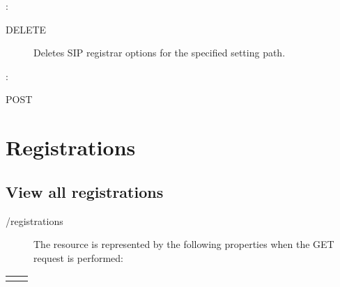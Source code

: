 \documentclass[letterpaper,10pt,english]{sphinxmanual}
\begin{document}
:

\begin{sphinxVerbatim}[commandchars=\\\{\}]
\end{sphinxVerbatim}
\begin{description}
\item[{ DELETE}] \leavevmode
Deletes SIP registrar options for the specified setting path.

\end{description}

:

\begin{sphinxVerbatim}[commandchars=\\\{\}]
\end{sphinxVerbatim}

 POST


\section{Registrations}
\label{\detokenize{restapi:registrations}}

\subsection{View all registrations}
\label{\detokenize{restapi:view-all-registrations}}
 /registrations
\begin{description}
\item[{}] \leavevmode
The resource is represented by the following properties when the GET request is performed:

\end{description}


\begin{savenotes}\sphinxattablestart
\centering
\begin{tabulary}{\linewidth}[t]{|T|T|}
\hline

&
\\
\hline&\\
\hline
\end{tabulary}
\par
\sphinxattableend\end{savenotes}

\end{document}
